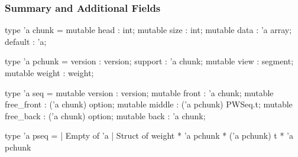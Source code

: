\begin{frame}[fragile]
\frametitle{Summary and Additional Fields}

\begin{multicols}{2}

\begin{camls}
type 'a chunk = {
  mutable head : int;
  mutable size : int;
  mutable data : 'a array;
  default : 'a; }
\end{camls}

\begin{camls}
type 'a pchunk = {
  version : version;
  support : 'a chunk;
  mutable view : segment;
  mutable weight : weight; }
\end{camls}

\end{multicols}

\begin{camls}
type 'a seq = {
  mutable version : version;
  mutable front : 'a chunk;
  mutable free_front : ('a chunk) option;
  mutable middle : ('a pchunk) PWSeq.t;
  mutable free_back : ('a chunk) option;
  mutable back : 'a chunk;
}
\end{camls}

\begin{camls}
type 'a pseq =
	 | Empty of 'a
    | Struct of weight * 'a pchunk * ('a pchunk) t * 'a pchunk
\end{camls}

\end{frame}




